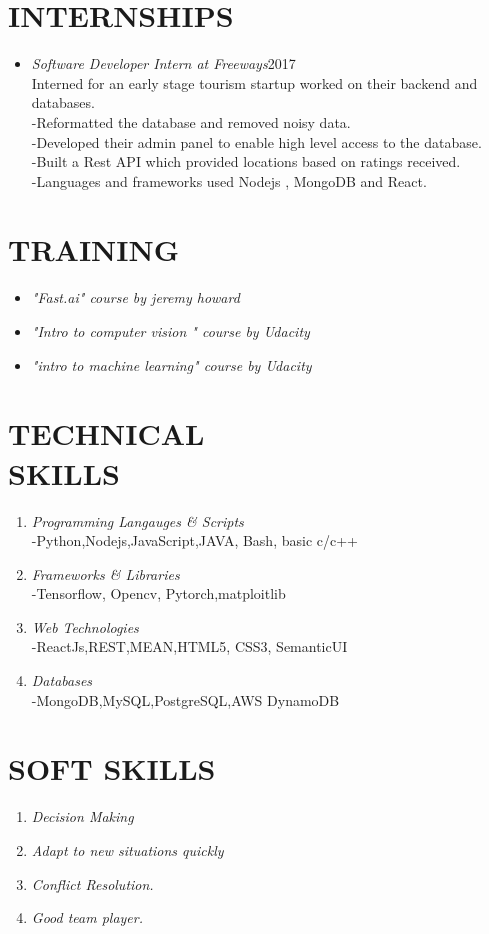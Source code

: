 \documentclass[margin]{res}
\begin{document}
\begin{resume}
\section{INTERNSHIPS} \begin{itemize}
 \item{\large{\sl Software Developer Intern at Freeways}}\hfill 2017 \\
 	Interned for an early stage tourism startup worked on their backend and databases.\\
	-Reformatted the database and removed noisy data.\\
	-Developed their admin panel to enable high level access to the database.\\
	-Built a Rest API which  provided locations  based on ratings received.\\
	-Languages and frameworks used Nodejs , MongoDB and React.\\
 \end{itemize}

\section{TRAINING}\begin{itemize}
 \item{\sl  "Fast.ai" course by jeremy howard }
 \item{\sl  "Intro to computer vision " course by Udacity}
 \item{\sl  "intro to machine learning" course by Udacity}
 \end{itemize}

\section{TECHNICAL  \\ SKILLS} \begin{enumerate}
\item {\sl Programming Langauges \& Scripts }\\
	-Python,Nodejs,JavaScript,JAVA, Bash, basic c/c++
\item {\sl Frameworks \& Libraries}\\
	-Tensorflow, Opencv, Pytorch,matploitlib
\item {\sl Web Technologies}\\
	-ReactJs,REST,MEAN,HTML5, CSS3, SemanticUI
\item{\sl Databases}\\
	-MongoDB,MySQL,PostgreSQL,AWS DynamoDB
\end{enumerate}

\section{SOFT SKILLS }\begin{enumerate}
\item{\sl Decision Making}
\item{\sl Adapt to new situations quickly}
\item{\sl Conflict Resolution.}
\item{\sl Good team player.}
\end{enumerate}


\end{resume}
\end{document}
